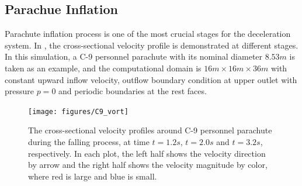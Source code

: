 \subsection{Parachue Inflation}
Parachute inflation process is one of the most crucial stages for the
deceleration system.
In , the cross-sectional velocity profile is  demonstrated at
different stages.
In this simulation, a C-9 personnel parachute with its nominal diameter
$8.53 m$ is taken as an example, and the computational domain is
$16 m\times16 m\times36 m$ with constant upward inflow velocity, outflow
boundary condition at upper outlet with pressure $p = 0$ and periodic
boundaries at the rest faces.
\begin{figure}
\centering
\texttt{[image: figures/C9\_vort]}
\caption{The cross-sectional velocity profiles around C-9 personnel
parachute during the falling process, at time $t = 1.2 s$, $t = 2.0 s$
and $t = 3.2 s$, respectively. In each plot, the left half shows the
velocity direction by arrow and the right half shows the velocity
magnitude by color, where red is large and blue is small.}
\label{fig:C9_vort}
\end{figure}

